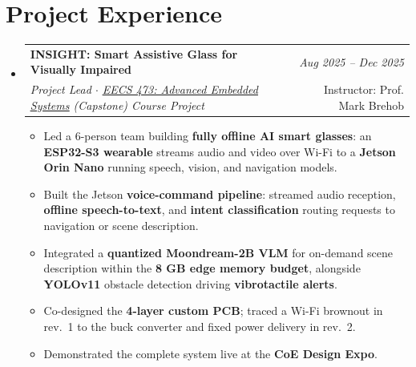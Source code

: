 \documentclass[12pt,letterpaper]{article}
\makeatletter
\newcommand{\resumeProject}[4]{
\vspace{0.5mm}\item
    \begin{tabular*}{0.98\linewidth}[t]{l@{\extracolsep{\fill}}r}
        \textbf{#1} & \textit{\footnotesize{#3}} \\
        \footnotesize{\textit{#2}} & \small{#4}
    \end{tabular*}
    \vspace{-2.4mm}
}
\newcommand{\resumeSubHeadingListStart}{\begin{itemize}[leftmargin=*,labelsep=3mm]}
\newcommand{\resumeItemListStart}{\begin{itemize}[leftmargin=*,labelsep=3mm,itemsep=0.5mm]}
\newcommand{\resumeSubHeadingListEnd}{\end{itemize}\vspace{-1mm}}
\newcommand{\resumeItemListEnd}{\end{itemize}\vspace{-1mm}}
\newcommand{\socialicon}[1]{\raisebox{-0.02em}{\resizebox{!}{0.8em}{#1}}}
\newcommand{\projlinks}[2]{%
  \if\relax\detokenize{#1}\relax\else\hspace{0.5em}\href{#1}{\textcolor{black}{\socialicon{\faYoutube}}}\fi
  \if\relax\detokenize{#2}\relax\else\hspace{0.4em}\href{#2}{\textcolor{black}{\socialicon{\faGithub}}}\fi
}
\makeatother
\begin{document}
\section{\textbf{Project Experience}}
\resumeSubHeadingListStart
\resumeProject
  {INSIGHT: Smart Assistive Glass for Visually Impaired\projlinks{https://www.youtube.com/watch?v=iU_iTmCLjYo}{https://github.com/GuanyuXu04/Smart_Glass}}
  {Project Lead $\cdot$ \href{https://www.eecs.umich.edu/courses/eecs473/overview.html}{\underline{EECS 473: Advanced Embedded Systems}} (Capstone) Course Project}
  {Aug 2025 -- Dec 2025}
  {Instructor: Prof. Mark Brehob}
\vspace{2mm}
\resumeItemListStart
    \item Led a 6-person team building \textbf{fully offline AI smart glasses}: an \textbf{ESP32-S3 wearable} streams audio and video over Wi-Fi to a \textbf{Jetson Orin Nano} running speech, vision, and navigation models.
    \item Built the Jetson \textbf{voice-command pipeline}: streamed audio reception, \textbf{offline speech-to-text}, and \textbf{intent classification} routing requests to navigation or scene description.
    \item Integrated a \textbf{quantized Moondream-2B VLM} for on-demand scene description within the \textbf{8 GB edge memory budget}, alongside \textbf{YOLOv11} obstacle detection driving \textbf{vibrotactile alerts}.
    \item Co-designed the \textbf{4-layer custom PCB}; traced a Wi-Fi brownout in rev.~1 to the buck converter and fixed power delivery in rev.~2.
    \item Demonstrated the complete system live at the \textbf{CoE Design Expo}.
\resumeItemListEnd

\resumeSubHeadingListEnd
\end{document}
